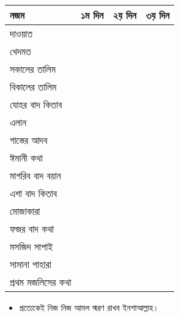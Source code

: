 \documentclass[landscape]{article}
\begin{document}
\begin{tabular}{@{}l|p{8cm}|p{8cm}|p{8cm}}
\toprule
নজম & ১ম দিন & ২য় দিন & ৩য় দিন\\
\hline  
দাওয়াত & & &\\
\hline
খেদমত & & &\\
\hline
সকালের তালিম & & &\\
\hline
বিকালের তালিম  & & &\\
\hline
যোহর বাদ কিতাব & & &\\
\hline
এলান & & &\\
\hline
গাস্তের আদব & & &\\
\hline
ঈমানী কথা & & &\\
\hline
মাগরিব বাদ বয়ান  & & &\\
\hline
এশা বাদ কিতাব & & &\\
\hline
মোজাকারা & & &\\
\hline
ফজর বাদ কথা & & &\\
\hline
মসজিদ সাপাই & & &\\
\hline
সামানা পাহারা & & &\\
\hline
প্রথম মজলিসের কথা & & &\\
\bottomrule
\end{tabular}
\begin{itemize}
\item প্রত্যেকেই নিজ নিজ আমল স্মরণ রাখব ইনশাআল্লাহ। 
\end{itemize}
\end{document}

